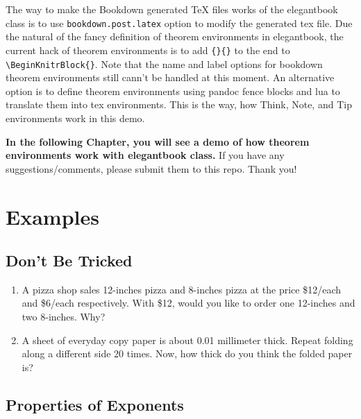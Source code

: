 \documentclass[en,11pt]{elegantbook}
\newcommand{\size}[2]{{\fontsize{#1}{0}\selectfont#2}}
\newenvironment{rmdthink}{
	\vspace*{0.5\baselineskip}
	\par\noindent
	\makebox[-4pt][r]{\color{green!90}\size{12}{\faLightbulbO}\,\,}
    \begin{tcolorbox}[
    enhanced,
    title={\textbf{\color{second}Think}},
    title style={left color=blue!10!green!20!white,right color=yellow!20!blue!20!white},
    colback=green!20!white,
    ]
    \sffamily
}{
    \end{tcolorbox}
	\par\ignorespacesafterend
}
\begin{document}
The way to make the Bookdown generated TeX files works of the elegantbook class is to use \texttt{bookdown.post.latex} option to modify the generated tex file. Due the natural of the fancy definition of theorem environments in elegantbook, the current hack of theorem environments is to add \texttt{\{\}\{\}} to the end to \texttt{\textbackslash{}BeginKnitrBlock\{\}}. Note that the name and label options for bookdown theorem environments still cann't be handled at this moment. An alternative option is to define theorem environments using pandoc fence blocks and lua to translate them into tex environments. This is the way, how Think, Note, and Tip environments work in this demo.

\textbf{In the following Chapter, you will see a demo of how theorem environments work with elegantbook class.} If you have any suggestions/comments, please submit them to this repo. Thank you!

\hypertarget{examples}{%
\chapter{Examples}\label{examples}}

\hypertarget{dont-be-tricked}{%
\section{Don't Be Tricked}\label{dont-be-tricked}}

\begin{rmdthink}

\begin{enumerate}
\def\labelenumi{\arabic{enumi}.}
\item
  A pizza shop sales 12-inches pizza and 8-inches pizza at the price \$12/each and \$6/each respectively. With \$12, would you like to order one 12-inches and two 8-inches. Why?
\item
  A sheet of everyday copy paper is about 0.01 millimeter thick. Repeat folding along a different side 20 times. Now, how thick do you think the folded paper is?
\end{enumerate}

\end{rmdthink}

\hypertarget{properties-of-exponents}{%
\section{Properties of Exponents}\label{properties-of-exponents}}
\end{document}
